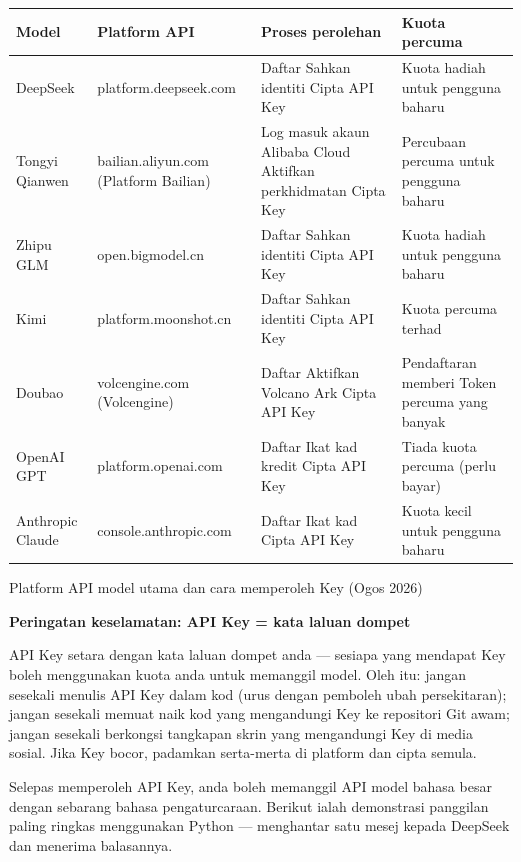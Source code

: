 \begin{center}
\begin{tabularx}{\linewidth}{|X|X|X|X|}
\hline
\textbf{Model} & \textbf{Platform API} & \textbf{Proses perolehan} & \textbf{Kuota percuma} \tabularnewline
\hline
DeepSeek & platform.deepseek.com & Daftar Sahkan identiti Cipta API Key & Kuota hadiah untuk pengguna baharu \tabularnewline
Tongyi Qianwen & bailian.aliyun.com (Platform Bailian) & Log masuk akaun Alibaba Cloud Aktifkan perkhidmatan Cipta Key & Percubaan percuma untuk pengguna baharu \tabularnewline
Zhipu GLM & open.bigmodel.cn & Daftar Sahkan identiti Cipta API Key & Kuota hadiah untuk pengguna baharu \tabularnewline
Kimi & platform.moonshot.cn & Daftar Sahkan identiti Cipta API Key & Kuota percuma terhad \tabularnewline
Doubao & volcengine.com (Volcengine) & Daftar Aktifkan Volcano Ark Cipta API Key & Pendaftaran memberi Token percuma yang banyak \tabularnewline
OpenAI GPT & platform.openai.com & Daftar Ikat kad kredit Cipta API Key & Tiada kuota percuma (perlu bayar) \tabularnewline
Anthropic Claude & console.anthropic.com & Daftar Ikat kad Cipta API Key & Kuota kecil untuk pengguna baharu \tabularnewline
\hline
\end{tabularx}
\end{center}

\begin{center}\small\color{gray}Platform API model utama dan cara memperoleh Key (Ogos 2026)\end{center}

\textbf{Peringatan keselamatan: API Key = kata laluan dompet}\par

API Key setara dengan kata laluan dompet anda — sesiapa yang mendapat Key boleh menggunakan kuota anda untuk memanggil model. Oleh itu: jangan sesekali menulis API Key dalam kod (urus dengan pemboleh ubah persekitaran); jangan sesekali memuat naik kod yang mengandungi Key ke repositori Git awam; jangan sesekali berkongsi tangkapan skrin yang mengandungi Key di media sosial. Jika Key bocor, padamkan serta-merta di platform dan cipta semula.


Selepas memperoleh API Key, anda boleh memanggil API model bahasa besar dengan sebarang bahasa pengaturcaraan. Berikut ialah demonstrasi panggilan paling ringkas menggunakan Python — menghantar satu mesej kepada DeepSeek dan menerima balasannya.

